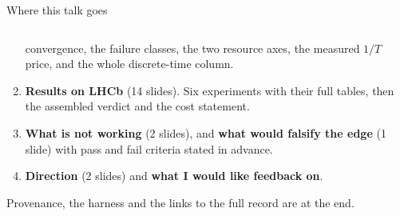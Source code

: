 \documentclass[aspectratio=169,10pt]{beamer}
\newcommand{\hl}[1]{{\color{accent}\textbf{#1}}}
\begin{document}
\begin{frame}[shrink=25]{Where this talk goes}
\begin{columns}[T]
\begin{column}{0.5\textwidth}
\begin{enumerate}
              convergence, the failure classes, the two resource axes, the
              measured $1/T$ price, and the whole discrete-time column.
        \item \hl{Results on LHCb} (14 slides). Six experiments with their full
              tables, then the assembled verdict and the cost statement.
        \item \hl{What is not working} (2 slides), and \hl{what would falsify
              the edge} (1 slide) with pass and fail criteria stated in advance.
        \item \hl{Direction} (2 slides) and \hl{what I would like feedback on}.
      \end{enumerate}
      \vspace{3mm}
      {\small\color{black!60} Provenance, the harness and the links to the full
       record are at the end.}
    \end{column}
  \end{columns}
\end{frame}

\end{document}
